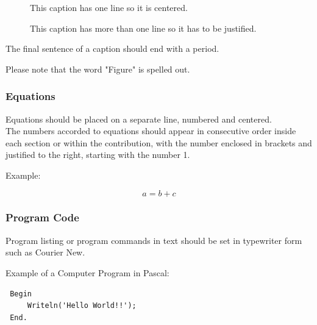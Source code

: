\documentclass[a4paper,twoside]{article}
\begin{document}
\begin{figure}[!h]
  \centering
   {}
  \caption{This caption has one line so it is centered.}
  \label{fig:example1}
 \end{figure}

\begin{figure}[!h]
  \vspace{-0.2cm}
  \centering
   {}
  \caption{This caption has more than one line so it has to be justified.}
  \label{fig:example2}
  \vspace{-0.1cm}
\end{figure}

The final sentence of a caption should end with a period.



Please note that the word "Figure" is spelled out.

\subsubsection{Equations}

Equations should be placed on a separate line, numbered and
centered.\\The numbers accorded to equations should appear in
consecutive order inside each section or within the contribution,
with the number enclosed in brackets and justified to the right,
starting with the number 1.

Example:

\begin{equation}\label{eq1}
    a=b+c
\end{equation}

\subsubsection{Program Code}\label{subsubsec:program_code}

Program listing or program commands in text should be set in
typewriter form such as Courier New.

Example of a Computer Program in Pascal:

\begin{small}
\begin{verbatim}
 Begin
     Writeln('Hello World!!');
 End.
\end{verbatim}
\end{small}
\end{document}
